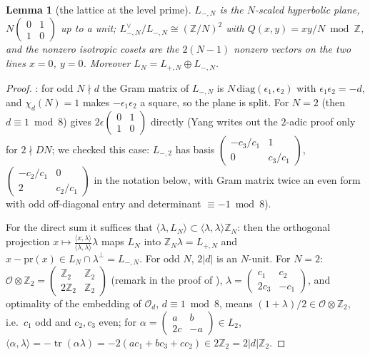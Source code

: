 \documentclass[11pt,reqno]{amsart}
\theoremstyle{plain}
\newtheorem{lemma}[theorem]{Lemma}
\theoremstyle{definition}
\DeclareMathOperator{\tr}{tr}
\newcommand{\Z}{\mathbb{Z}}
\begin{document}
\begin{lemma}[the lattice at the level prime]\label{lem:LN}
$L_{-,N}$ is the $N$-scaled hyperbolic plane, $N\begin{pmatrix}0&1\\1&0\end{pmatrix}$ up to a
unit; $L_{-,N}^\vee/L_{-,N}\cong(\Z/N)^2$ with $Q(x,y)=xy/N\bmod\Z$, and the nonzero isotropic
cosets are the $2(N-1)$ nonzero vectors on the two lines $x=0$, $y=0$. Moreover
$L_N=L_{+,N}\oplus L_{-,N}$.
\end{lemma}
\begin{proof}
\cite[Lemma~18(1)]{Yang}: for odd $N\nmid d$ the Gram matrix of $L_{-,N}$ is
$N\,\mathrm{diag}(\epsilon_1,\epsilon_2)$ with $\epsilon_1\epsilon_2=-d$, and $\chi_d(N)=1$ makes
$-\epsilon_1\epsilon_2$ a square, so the plane is split. For $N=2$ (then $d\equiv1\bmod8$)
\cite[Lemma~18(3)]{Yang} gives $2\epsilon\begin{pmatrix}0&1\\1&0\end{pmatrix}$ directly (Yang
writes out the $2$-adic proof only for $2\nmid DN$; we checked this case: $L_{-,2}$ has basis
$\begin{pmatrix}-c_3/c_1&1\\0&c_3/c_1\end{pmatrix}$,
$\begin{pmatrix}-c_2/c_1&0\\2&c_2/c_1\end{pmatrix}$ in the notation below, with Gram matrix twice
an even form with odd off-diagonal entry and determinant $\equiv-1\bmod8$).

For the direct sum it suffices that $\langle\lambda,L_N\rangle\subset\langle\lambda,\lambda\rangle
\Z_N$: then the orthogonal projection $x\mapsto\frac{\langle x,\lambda\rangle}{\langle\lambda,
\lambda\rangle}\lambda$ maps $L_N$ into $\Z_N\lambda=L_{+,N}$ and $x-\mathrm{pr}(x)\in L_N\cap
\lambda^\perp=L_{-,N}$. For odd $N$, $2\lvert d\rvert$ is an $N$-unit. For $N=2$:
$\mathcal O\otimes\Z_2=\begin{pmatrix}\Z_2&\Z_2\\2\Z_2&\Z_2\end{pmatrix}$ (remark in the proof of
\cite[Lemma~18]{Yang}), $\lambda=\begin{pmatrix}c_1&c_2\\2c_3&-c_1\end{pmatrix}$, and optimality
of the embedding of $\mathcal O_d$, $d\equiv1\bmod8$, means $(1+\lambda)/2\in\mathcal O\otimes
\Z_2$, i.e.\ $c_1$ odd and $c_2,c_3$ even; for $\alpha=\begin{pmatrix}a&b\\2c&-a\end{pmatrix}\in
L_2$, $\langle\alpha,\lambda\rangle=-\tr(\alpha\lambda)=-2(ac_1+bc_3+cc_2)\in2\Z_2=
2\lvert d\rvert\Z_2$.
\end{proof}
\end{document}
